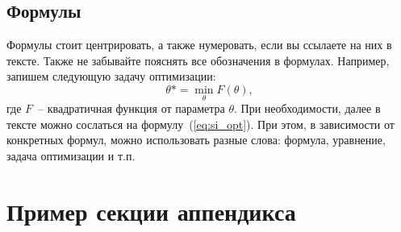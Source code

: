 \documentclass[a4paper,12pt]{extarticle}
\begin{document}
\subsection{Формулы}

Формулы стоит центрировать, а также нумеровать, если вы ссылаете на них в тексте. Также не забывайте пояснять все обозначения в формулах. Например, запишем следующую задачу оптимизации:
\begin{equation}
    \label{eq:si_opt}
        \theta* = \min_{\theta} F(\theta),
\end{equation}
где $F$~-- квадратичная функция от параметра $\theta$. При необходимости, далее в тексте можно сослаться на формулу~(\ref{eq:si_opt}). При этом, в зависимости от конкретных формул, можно использовать разные слова: формула, уравнение, задача оптимизации и т.п.


	
\newpage 
\printbibliography[heading=bibintoc] 

	
\newpage
\appendix

\section{Пример секции аппендикса}
\end{document}
